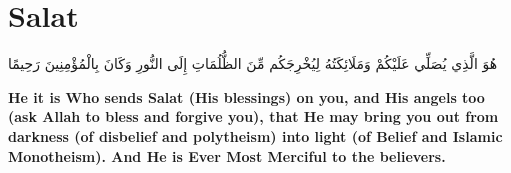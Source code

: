 \chapter{Salat}
\begin{center}
    {\Huge    
        \begin{Arabic}
            هُوَ الَّذِي يُصَلِّي عَلَيْكُمْ وَمَلَائِكَتُهُ لِيُخْرِجَكُم مِّنَ الظُّلُمَاتِ إِلَى النُّورِ وَكَانَ بِالْمُؤْمِنِينَ رَحِيمًا
        \end{Arabic}
    }    
\end{center}
\vspace*{\fill}
\vspace{3cm}
\begin{center}
    \Large \textbf{He it is Who sends Salat (His blessings) on you, and His angels too (ask Allah to bless and forgive you), that He may bring you out from darkness (of disbelief and polytheism) into light (of Belief and Islamic Monotheism). And He is Ever Most Merciful to the believers.}
\end{center}
